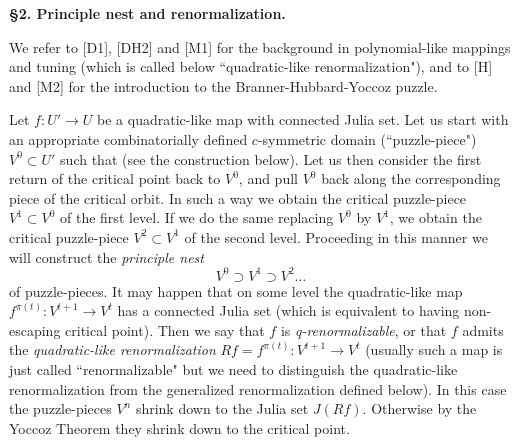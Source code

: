 \bigskip

\centerline{\bf \S 2. Principle nest and renormalization.}\bigskip

We refer to [D1], [DH2] and [M1] for the background in polynomial-like 
mappings and tuning (which is called below
 ``quadratic-like renormalization"),
and to [H] and [M2] for the introduction to the Branner-Hubbard-Yoccoz puzzle.

Let  $f: U'\rightarrow U$ be a quadratic-like map  with
connected Julia set. Let us start with an appropriate combinatorially defined
$c$-symmetric domain (``puzzle-piece")
$V^0\subset U'$  such that 
(see the construction below). 
Let us then consider the first return of the critical point back to $V^0$,
and pull $V^0$ back along the corresponding piece of the critical orbit.
In such a way we obtain the critical puzzle-piece $V^1\subset V^0$ of the
first  level.
 If we do the same replacing $V^0$ by $V^1$, we 
obtain the critical puzzle-piece $V^2\subset V^1$ of the second level. 
Proceeding in this  manner we will construct the
{\sl principle nest}
$$V^0\supset V^1\supset V^2\ldots$$
of puzzle-pieces. It may happen that on some level the quadratic-like map
$f^{\pi(t)}: V^{t+1}\rightarrow V^t$  has a connected Julia set
(which is equivalent to having non-escaping critical point). 
Then we say that $f$ is {\sl q-renormalizable}, or
that $f$ admits the {\sl quadratic-like renormalization} 
$R f=f^{\pi(t)}: V^{t+1}\rightarrow V^t$
(usually such a map is just called ``renormalizable" but we need 
 to distinguish  the quadratic-like renormalization from
  the generalized renormalization defined below).
 In this case
the puzzle-pieces $V^n$ shrink down to the Julia set $J(R f)$.
Otherwise by the
Yoccoz Theorem they shrink down to the critical point.



